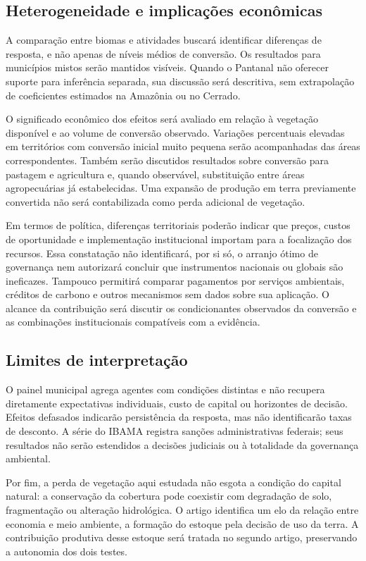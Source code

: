 \subsection{Heterogeneidade e implicações econômicas}

A comparação entre biomas e atividades buscará identificar diferenças de resposta, e não apenas de níveis médios de conversão. Os resultados para municípios mistos serão mantidos visíveis. Quando o Pantanal não oferecer suporte para inferência separada, sua discussão será descritiva, sem extrapolação de coeficientes estimados na Amazônia ou no Cerrado.

O significado econômico dos efeitos será avaliado em relação à vegetação disponível e ao volume de conversão observado. Variações percentuais elevadas em territórios com conversão inicial muito pequena serão acompanhadas das áreas correspondentes. Também serão discutidos resultados sobre conversão para pastagem e agricultura e, quando observável, substituição entre áreas agropecuárias já estabelecidas. Uma expansão de produção em terra previamente convertida não será contabilizada como perda adicional de vegetação.

Em termos de política, diferenças territoriais poderão indicar que preços, custos de oportunidade e implementação institucional importam para a focalização dos recursos. Essa constatação não identificará, por si só, o arranjo ótimo de governança nem autorizará concluir que instrumentos nacionais ou globais são ineficazes. Tampouco permitirá comparar pagamentos por serviços ambientais, créditos de carbono e outros mecanismos sem dados sobre sua aplicação. O alcance da contribuição será discutir os condicionantes observados da conversão e as combinações institucionais compatíveis com a evidência.

\subsection{Limites de interpretação}

O painel municipal agrega agentes com condições distintas e não recupera diretamente expectativas individuais, custo de capital ou horizontes de decisão. Efeitos defasados indicarão persistência da resposta, mas não identificarão taxas de desconto. A série do IBAMA registra sanções administrativas federais; seus resultados não serão estendidos a decisões judiciais ou à totalidade da governança ambiental.

Por fim, a perda de vegetação aqui estudada não esgota a condição do capital natural: a conservação da cobertura pode coexistir com degradação de solo, fragmentação ou alteração hidrológica. O artigo identifica um elo da relação entre economia e meio ambiente, a formação do estoque pela decisão de uso da terra. A contribuição produtiva desse estoque será tratada no segundo artigo, preservando a autonomia dos dois testes.

